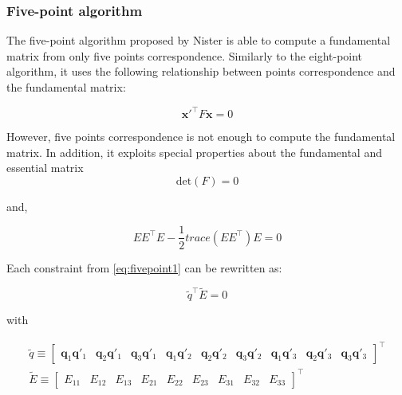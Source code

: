 \documentclass[12pt]{article}
\begin{document}
\subsubsection{Five-point algorithm}

The five-point algorithm proposed by Nister\cite{FivePointNister04} is able to compute a fundamental matrix from only five points correspondence. Similarly to the eight-point algorithm, it uses the following relationship between points correspondence and the fundamental matrix:

\begin{equation}
  \label{eq:fivepoint1}
  \mathbf{x}'^\top F \mathbf{x} = 0
\end{equation}

However, five points correspondence is not enough to compute the fundamental matrix. In addition, it exploits special properties about the fundamental and essential matrix
\begin{equation}
  \label{eq:fivepoint2}
  \text{det}(F) = 0
\end{equation}

and, 

\begin{equation}
  \label{eq:fivepoint3}
  EE^\top E - \frac{1}{2} trace(EE^\top)E = 0 
\end{equation}

Each constraint from \ref{eq:fivepoint1} can be rewritten as: 

\begin{equation}
  \label{eq:fivepoint4}
  \tilde{q}^\top \widetilde{E} = 0
\end{equation}

with 

\begin{align}
\tilde{q} \equiv \left [ \begin{matrix} \mathbf{q}_1\mathbf{q}'_1 &
  \mathbf{q}_2\mathbf{q}'_1 &
 \mathbf{q}_3\mathbf{q}'_1 &
 \mathbf{q}_1\mathbf{q}'_2 &
 \mathbf{q}_2\mathbf{q}'_2 &
 \mathbf{q}_3\mathbf{q}'_2 &
 \mathbf{q}_1\mathbf{q}'_3 & 
 \mathbf{q}_2\mathbf{q}'_3 &
 \mathbf{q}_3\mathbf{q}'_3
 \end{matrix} \right]^\top \\
\tilde{E} \equiv \left [ 
\begin{matrix}
E_{11} & 
E_{12} & 
E_{13} & 
E_{21} & 
E_{22} & 
E_{23} & 
E_{31} & 
E_{32} &
E_{33} 
\end{matrix}
\right ] ^\top
\end{align}
\end{document}

